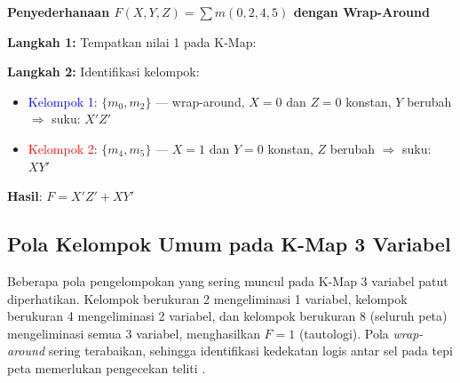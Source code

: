 \begin{contoh}
\textbf{Penyederhanaan $F(X,Y,Z) = \sum m(0, 2, 4, 5)$ dengan Wrap-Around}

\textbf{Langkah 1:} Tempatkan nilai 1 pada K-Map:

\begin{center}
\end{center}

\textbf{Langkah 2:} Identifikasi kelompok:
\begin{itemize}
    \item \textcolor{blue}{Kelompok 1}: $\{m_0, m_2\}$ --- wrap-around, $X = 0$ dan $Z = 0$ konstan, $Y$ berubah $\Rightarrow$ suku: $X'Z'$
    \item \textcolor{red}{Kelompok 2}: $\{m_4, m_5\}$ --- $X = 1$ dan $Y = 0$ konstan, $Z$ berubah $\Rightarrow$ suku: $XY'$
\end{itemize}

\textbf{Hasil}: $F = X'Z' + XY'$
\end{contoh}

\subsection{Pola Kelompok Umum pada K-Map 3 Variabel}

Beberapa pola pengelompokan yang sering muncul pada K-Map 3 variabel patut diperhatikan. Kelompok berukuran 2 mengeliminasi 1 variabel, kelompok berukuran 4 mengeliminasi 2 variabel, dan kelompok berukuran 8 (seluruh peta) mengeliminasi semua 3 variabel, menghasilkan $F = 1$ (tautologi). Pola \textit{wrap-around} sering terabaikan, sehingga identifikasi kedekatan logis antar sel pada tepi peta memerlukan pengecekan teliti \cite{wiki_karnaugh}.
